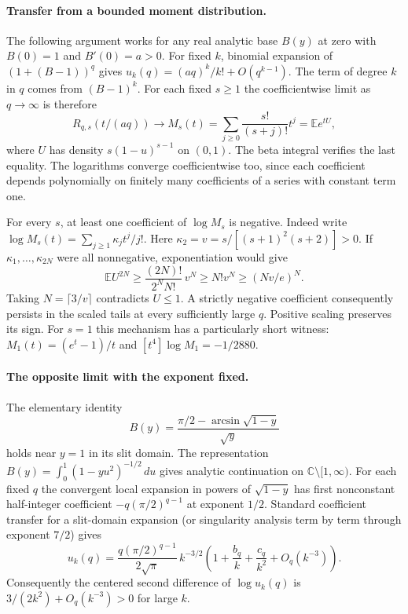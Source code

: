 \documentclass[11pt,a4paper]{article}
\numberwithin{equation}{section}
\begin{document}
\paragraph{Transfer from a bounded moment distribution.}
The following argument works for any real analytic base $B(y)$ at
zero with $B(0)=1$ and $B'(0)=a>0$. For fixed $k$, binomial expansion
of $(1+(B-1))^q$ gives $u_k(q)=(aq)^k/k!+O(q^{k-1})$. The term of
degree $k$ in $q$ comes from $(B-1)^k$. For each fixed $s\ge1$ the
coefficientwise limit as $q\to\infty$ is therefore
\[
 R_{q,s}(t/(aq))\longrightarrow
 M_s(t)=\sum_{j\ge0}\frac{s!}{(s+j)!}t^j=\mathbb E e^{tU},
\]
where $U$ has density $s(1-u)^{s-1}$ on $(0,1)$. The beta integral
verifies the last equality. The logarithms converge coefficientwise
too, since each coefficient depends polynomially on finitely many
coefficients of a series with constant term one.

For every $s$, at least one coefficient of $\log M_s$ is negative.
Indeed write $\log M_s(t)=\sum_{j\ge1}\kappa_jt^j/j!$. Here
$\kappa_2=v=s/[(s+1)^2(s+2)]>0$. If $\kappa_1,\dots,\kappa_{2N}$
were all nonnegative, exponentiation would give
\[
 \mathbb E U^{2N}\ge \frac{(2N)!}{2^N N!}\,v^N
                 \ge N!v^N \ge (Nv/e)^N.
\]
Taking $N=\lceil3/v\rceil$ contradicts $U\le1$. A strictly negative
coefficient consequently persists in the scaled tails at every
sufficiently large $q$. Positive scaling preserves its sign. For
$s=1$ this mechanism has a particularly short witness:
$M_1(t)=(e^t-1)/t$ and $[t^4]\log M_1=-1/2880$.

\paragraph{The opposite limit with the exponent fixed.}
The elementary identity
\[
 B(y)=\frac{\pi/2-\arcsin\sqrt{1-y}}{\sqrt y}
\]
holds near $y=1$ in its slit domain. The representation
$B(y)=\int_0^1(1-yu^2)^{-1/2}\,du$ gives analytic continuation on
$\mathbb C\setminus[1,\infty)$. For each fixed $q$ the convergent
local expansion in powers of $\sqrt{1-y}$ has first nonconstant
half-integer coefficient $-q(\pi/2)^{q-1}$ at exponent $1/2$.
Standard coefficient transfer for a slit-domain expansion (or
singularity analysis term by term through exponent $7/2$) gives
\[
 u_k(q)=\frac{q(\pi/2)^{q-1}}{2\sqrt\pi}\,k^{-3/2}
       \left(1+\frac{b_q}{k}+\frac{c_q}{k^2}+O_q(k^{-3})\right).
\]
Consequently the centered second difference of $\log u_k(q)$ is
$3/(2k^2)+O_q(k^{-3})>0$ for large $k$.
\end{document}
